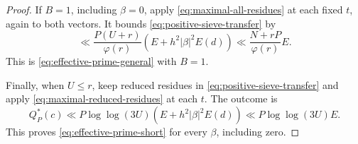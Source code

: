 \documentclass[10pt,a4paper]{amsart}
\begin{document}
\begin{proof}
If $B=1$, including $\beta=0$, apply
\eqref{eq:maximal-all-residues} at each fixed $t$, again to both vectors.
It bounds \eqref{eq:positive-sieve-transfer} by
\[
 \ll\frac{P(U+r)}{\varphi(r)}
                  (E+h^2|\beta|^2E(d))
 \ll\frac{N+rP}{\varphi(r)}E.
\]
This is \eqref{eq:effective-prime-general} with $B=1$.

Finally, when $U\le r$, keep reduced residues in
\eqref{eq:positive-sieve-transfer} and apply
\eqref{eq:maximal-reduced-residues} at each $t$.
The outcome is
\[
 Q_P^*(c)\ll P\log\log(3U)
                  (E+h^2|\beta|^2E(d))
 \ll P\log\log(3U)E.
\]
This proves \eqref{eq:effective-prime-short} for every $\beta$, including zero.
\end{proof}
\end{document}
